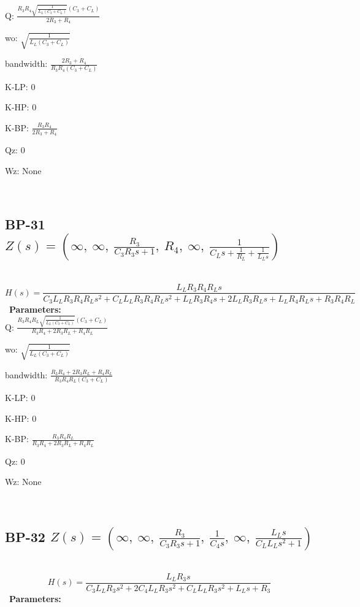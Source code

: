\documentclass{article}
\begin{document}
Q: $\frac{R_{3} R_{4} \sqrt{\frac{1}{L_{L} \left(C_{3} + C_{L}\right)}} \left(C_{3} + C_{L}\right)}{2 R_{3} + R_{4}}$\ 

wo: $\sqrt{\frac{1}{L_{L} \left(C_{3} + C_{L}\right)}}$\ 

bandwidth: $\frac{2 R_{3} + R_{4}}{R_{3} R_{4} \left(C_{3} + C_{L}\right)}$\ 

K-LP: $0$\ 

K-HP: $0$\ 

K-BP: $\frac{R_{3} R_{4}}{2 R_{3} + R_{4}}$\ 

Qz: $0$\ 

Wz: $\text{None}$\ 

\ 

\subsection{BP-31 $Z(s) = \left( \infty, \  \infty, \  \frac{R_{3}}{C_{3} R_{3} s + 1}, \  R_{4}, \  \infty, \  \frac{1}{C_{L} s + \frac{1}{R_{L}} + \frac{1}{L_{L} s}}\right)$ } \ 
\textbf{\[H(s) = \frac{L_{L} R_{3} R_{4} R_{L} s}{C_{3} L_{L} R_{3} R_{4} R_{L} s^{2} + C_{L} L_{L} R_{3} R_{4} R_{L} s^{2} + L_{L} R_{3} R_{4} s + 2 L_{L} R_{3} R_{L} s + L_{L} R_{4} R_{L} s + R_{3} R_{4} R_{L}}\] } \ 
\textbf{Parameters:}\\ 

Q: $\frac{R_{3} R_{4} R_{L} \sqrt{\frac{1}{L_{L} \left(C_{3} + C_{L}\right)}} \left(C_{3} + C_{L}\right)}{R_{3} R_{4} + 2 R_{3} R_{L} + R_{4} R_{L}}$\ 

wo: $\sqrt{\frac{1}{L_{L} \left(C_{3} + C_{L}\right)}}$\ 

bandwidth: $\frac{R_{3} R_{4} + 2 R_{3} R_{L} + R_{4} R_{L}}{R_{3} R_{4} R_{L} \left(C_{3} + C_{L}\right)}$\ 

K-LP: $0$\ 

K-HP: $0$\ 

K-BP: $\frac{R_{3} R_{4} R_{L}}{R_{3} R_{4} + 2 R_{3} R_{L} + R_{4} R_{L}}$\ 

Qz: $0$\ 

Wz: $\text{None}$\ 

\ 

\subsection{BP-32 $Z(s) = \left( \infty, \  \infty, \  \frac{R_{3}}{C_{3} R_{3} s + 1}, \  \frac{1}{C_{4} s}, \  \infty, \  \frac{L_{L} s}{C_{L} L_{L} s^{2} + 1}\right)$ } \ 
\textbf{\[H(s) = \frac{L_{L} R_{3} s}{C_{3} L_{L} R_{3} s^{2} + 2 C_{4} L_{L} R_{3} s^{2} + C_{L} L_{L} R_{3} s^{2} + L_{L} s + R_{3}}\] } \ 
\textbf{Parameters:}\\ 
\end{document}
